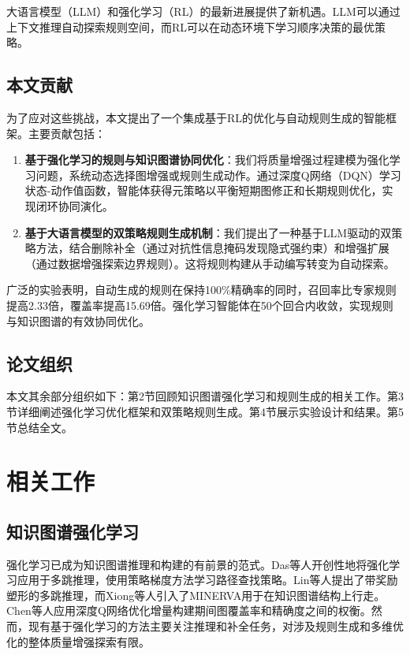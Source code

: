 \documentclass[runningheads]{llncs}
\begin{document}
大语言模型（LLM）和强化学习（RL）的最新进展提供了新机遇。LLM可以通过上下文推理自动探索规则空间，而RL可以在动态环境下学习顺序决策的最优策略。

\subsection{本文贡献}
为了应对这些挑战，本文提出了一个集成基于RL的优化与自动规则生成的智能框架。主要贡献包括：

\begin{enumerate}
    \item \textbf{基于强化学习的规则与知识图谱协同优化}：我们将质量增强过程建模为强化学习问题，系统动态选择图增强或规则生成动作。通过深度Q网络（DQN）学习状态-动作值函数，智能体获得元策略以平衡短期图修正和长期规则优化，实现闭环协同演化。
    \item \textbf{基于大语言模型的双策略规则生成机制}：我们提出了一种基于LLM驱动的双策略方法，结合删除补全（通过对抗性信息掩码发现隐式强约束）和增强扩展（通过数据增强探索边界规则）。这将规则构建从手动编写转变为自动探索。
\end{enumerate}

广泛的实验表明，自动生成的规则在保持100\%精确率的同时，召回率比专家规则提高2.33倍，覆盖率提高15.69倍。强化学习智能体在50个回合内收敛，实现规则与知识图谱的有效协同优化。

\subsection{论文组织}
本文其余部分组织如下：第2节回顾知识图谱强化学习和规则生成的相关工作。第3节详细阐述强化学习优化框架和双策略规则生成。第4节展示实验设计和结果。第5节总结全文。

\section{相关工作}
\label{sec:related_work}

\subsection{知识图谱强化学习}
强化学习已成为知识图谱推理和构建的有前景的范式。Das等人开创性地将强化学习应用于多跳推理，使用策略梯度方法学习路径查找策略。Lin等人提出了带奖励塑形的多跳推理，而Xiong等人引入了MINERVA用于在知识图谱结构上行走。Chen等人应用深度Q网络优化增量构建期间图覆盖率和精确度之间的权衡。然而，现有基于强化学习的方法主要关注推理和补全任务，对涉及规则生成和多维优化的整体质量增强探索有限。
\end{document}
